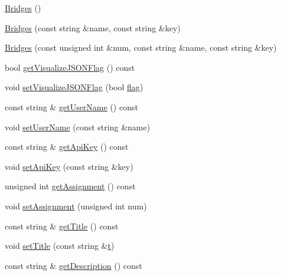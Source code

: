 \begin{DoxyCompactItemize}
\item 
\mbox{\hyperlink{classbridges_1_1_bridges_aab8b250b2b5ba0034ceb2494fe5ea437}{Bridges}} ()
\item 
\mbox{\hyperlink{classbridges_1_1_bridges_a21d9e98cb1f3994300079b489f14e71e}{Bridges}} (const string \&name, const string \&key)
\item 
\mbox{\hyperlink{classbridges_1_1_bridges_a84162a660dec9f7bc11e1f01cada4179}{Bridges}} (const unsigned int \&num, const string \&name, const string \&key)
\item 
bool \mbox{\hyperlink{classbridges_1_1_bridges_a6c2897b19a25989e09c031152a74317d}{get\+Visualize\+J\+S\+O\+N\+Flag}} () const
\item 
void \mbox{\hyperlink{classbridges_1_1_bridges_a69aca37ab2729d0345e0549d7baf0423}{set\+Visualize\+J\+S\+O\+N\+Flag}} (bool \mbox{\hyperlink{namespacebridges_acfb0a4f7877d8f63de3e6862004c50eda327a6c4304ad5938eaf0efb6cc3e53dc}{flag}})
\item 
const string \& \mbox{\hyperlink{classbridges_1_1_bridges_ad16be2d94936fd555bc05f58c8c21f50}{get\+User\+Name}} () const
\item 
void \mbox{\hyperlink{classbridges_1_1_bridges_ab0b00033e54d25968f5ecb61c31c7de3}{set\+User\+Name}} (const string \&name)
\item 
const string \& \mbox{\hyperlink{classbridges_1_1_bridges_a9a44f38d883859ef19c94ce17eec43b5}{get\+Api\+Key}} () const
\item 
void \mbox{\hyperlink{classbridges_1_1_bridges_a3f9f21464393b8fce79a77809c6aa17e}{set\+Api\+Key}} (const string \&key)
\item 
unsigned int \mbox{\hyperlink{classbridges_1_1_bridges_aa45b4ba781b5cbecc8cb04c76dfd527a}{get\+Assignment}} () const
\item 
void \mbox{\hyperlink{classbridges_1_1_bridges_aca7a68fb8cc0d1bec81656dfa77b1162}{set\+Assignment}} (unsigned int num)
\item 
const string \& \mbox{\hyperlink{classbridges_1_1_bridges_a8fe8c79b0f852c0049a699c801e40a61}{get\+Title}} () const
\item 
void \mbox{\hyperlink{classbridges_1_1_bridges_ac9f2e0b5fd5c70053db233dcbb636b56}{set\+Title}} (const string \&\mbox{\hyperlink{namespacebridges_acfb0a4f7877d8f63de3e6862004c50edae358efa489f58062f10dd7316b65649e}{t}})
\item 
const string \& \mbox{\hyperlink{classbridges_1_1_bridges_ae9f238e1d9fc421c6c08aacb74e0ef6c}{get\+Description}} () const

\end{DoxyCompactItemize}
